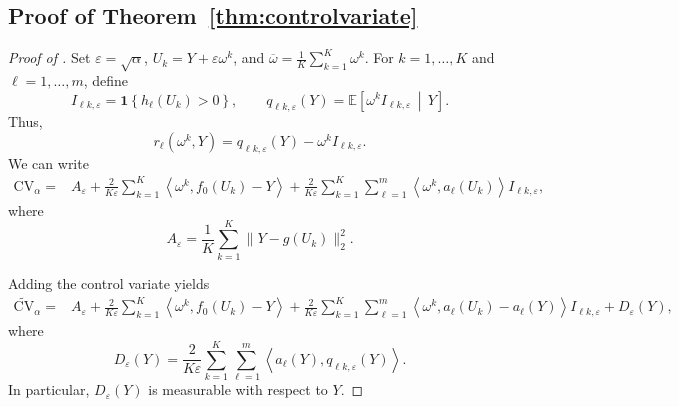 \documentclass[12pt]{article}
\newcommand{\Indc}[1]{{\mathbf{1}\left\{{#1}\right\}}}
\theoremstyle{general}
\newcommand{\cv}{{\mathrm{CV}}}
\begin{document}
\subsection{Proof of Theorem~\ref{thm:controlvariate}}
\label{prf:thm:controlvariate}
\begin{proof}[Proof of ]
Set $\varepsilon=\sqrt{\alpha}$,
$U_k=Y+\varepsilon\omega^k$,
and $\overline\omega=\frac1K\sum_{k=1}^K\omega^k$.
For \(k=1,\ldots,K\) and \(\ell=1,\ldots,m\), define
\[
I_{\ell k,\varepsilon}
=
\Indc{h_\ell(U_k)>0},\qquad
q_{\ell k,\varepsilon}(Y)
=
\mathbb E\!\left[
\omega^k I_{\ell k,\varepsilon}
\,\middle|\,
Y
\right].
\]
Thus,
\[
r_\ell(\omega^k,Y)
=
q_{\ell k,\varepsilon}(Y)
-
\omega^k I_{\ell k,\varepsilon}.
\]
We can write
\begin{align*}
\cv_\alpha
={}&
A_\varepsilon
+
\frac{2}{K\varepsilon}
\sum_{k=1}^K
\left\langle
\omega^k,f_0(U_k)-Y
\right\rangle +
\frac{2}{K\varepsilon}
\sum_{k=1}^K\sum_{\ell=1}^m
\left\langle
\omega^k,a_\ell(U_k)
\right\rangle
I_{\ell k,\varepsilon},
\end{align*}
where
\[
A_\varepsilon
=
\frac1K\sum_{k=1}^K
\|Y-g(U_k)\|_2^2.
\]

Adding the control variate yields
\begin{align*}
\widetilde{\cv}_{\alpha}
={}&
A_\varepsilon
+
\frac{2}{K\varepsilon}
\sum_{k=1}^K
\left\langle
\omega^k,f_0(U_k)-Y
\right\rangle 
+
\frac{2}{K\varepsilon}
\sum_{k=1}^K\sum_{\ell=1}^m
\left\langle
\omega^k,
a_\ell(U_k)-a_\ell(Y)
\right\rangle
I_{\ell k,\varepsilon}
+
D_\varepsilon(Y),
\end{align*}
where
\[
D_\varepsilon(Y)
=
\frac{2}{K\varepsilon}
\sum_{k=1}^K\sum_{\ell=1}^m
\left\langle
a_\ell(Y),
q_{\ell k,\varepsilon}(Y)
\right\rangle.
\]
In particular, \(D_\varepsilon(Y)\) is measurable with respect to
\(Y\).


\end{proof}
\end{document}
